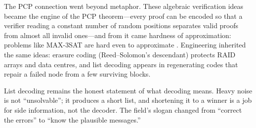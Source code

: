 The PCP connection went beyond metaphor. These algebraic verification ideas became the engine of the PCP theorem---every proof can be encoded so that a verifier reading a constant number of random positions separates valid proofs from almost all invalid ones---and from it came hardness of approximation: problems like MAX-3SAT are hard even to approximate \cite{sudan-list,sudan-pcp}. Engineering inherited the same ideas: erasure coding (Reed--Solomon's descendant) protects RAID arrays and data centres, and list decoding appears in regenerating codes that repair a failed node from a few surviving blocks.

List decoding remains the honest statement of what decoding means. Heavy noise is not ``unsolvable''; it produces a short list, and shortening it to a winner is a job for side information, not the decoder. The field's slogan changed from ``correct the errors'' to ``know the plausible messages.''

